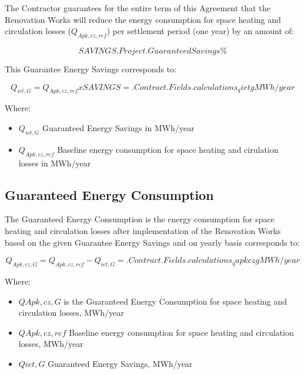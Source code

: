 The Contractor guarantees for the entire term of this Agreement that the
Renovation Works will reduce the energy consumption for space heating and
circulation losses ($Q_{Apk,cz,ref}$) per settlement period (one year) by an amount
of:

\[SAVINGS \iffalse input project.savings value="{{.Project.GuaranteedSavings}}" type="number" \fi {{.Project.GuaranteedSavings}} \%\]

This Guarantee Energy Savings corresponds to:

\[Q_{iet,G} = Q_{Apk, cz, ref} x SAVINGS = {{.Contract.Fields.calculations_qietg}} MWh/year\]

Where:

\begin{itemize}
	\item $Q_{iet,G}$	Guaranteed Energy Savings in MWh/year
	\item $Q_{Apk,cz,ref}$	Baseline energy consumption for space heating and cirulation losses in MWh/year
\end{itemize}

\subsection{Guaranteed Energy Consumption}
The Guaranteed Energy Consumption is the energy consumption for space heating
and circulation losses after implementation of the Renovation Works based on
the given Guarantee Energy Savings and on yearly basis corresponds to:

\[Q_{Apk,cz,G} = Q_{Apk,cz,ref} - Q_{iet,G} = {{.Contract.Fields.calculations_qapkczg}} MWh/year\]

Where:

\begin{itemize}
	\item $QApk,cz,G$	is the Guaranteed Energy Consumption for space heating and circulation losses, MWh/year
	\item $QApk,cz,ref$	Baseline energy consumption for space heating and circulation losses, MWh/year
	\item $Qiet,G$	Guaranteed Energy Savings, MWh/year
\end{itemize}
